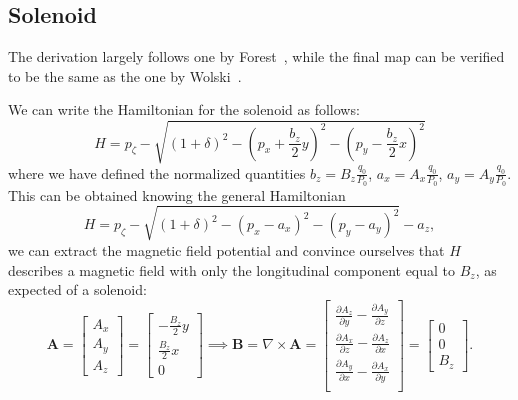 \subsection{Solenoid}

The derivation largely follows one by Forest~\cite{forest99}, while the final map can be verified to be the same as the one by Wolski~\cite{wolski2014beam}.

We can write the Hamiltonian for the solenoid as follows:
\begin{equation}
  H = p_\zeta -\sqrt{\left(1 + \delta \right)^2 - \left(p_x + \frac{b_z}{2}y\right)^2 - \left(p_y - \frac{b_z}{2}x\right)^2}
\end{equation}
where we have defined the normalized quantities $b_z = B_z\frac{q_0}{P_0}$, $a_x = A_x\frac{q_0}{P_0}$, $a_y = A_y\frac{q_0}{P_0}$.
This can be obtained knowing the general Hamiltonian
\begin{equation}
  H = p_\zeta -\sqrt{(1 + \delta)^2 - (p_x - a_x)^2 - (p_y - a_y)^2} - a_z,
\end{equation}
we can extract the magnetic field potential and convince ourselves that $H$ describes a magnetic field with only the longitudinal component equal to $B_z$, as expected of a solenoid:
\begin{equation}
  \mathbf{A} =
  \begin{bmatrix}
    A_x \\ A_y \\ A_z
  \end{bmatrix}
  = \begin{bmatrix}
    -\frac{B_z}{2}y\\
    \frac{B_z}{2}x\\
    0
  \end{bmatrix}
  \implies
  \mathbf{B} = \nabla \times \mathbf{A}
  = \begin{bmatrix}
    \frac{\partial A_z}{\partial y} - \frac{\partial A_y}{\partial z}\\
    \frac{\partial A_x}{\partial z} - \frac{\partial A_z}{\partial x}\\
    \frac{\partial A_y}{\partial x} - \frac{\partial A_x}{\partial y}\\
  \end{bmatrix}
  = \begin{bmatrix}
    0\\
    0\\
    B_z
  \end{bmatrix}.
\end{equation}

